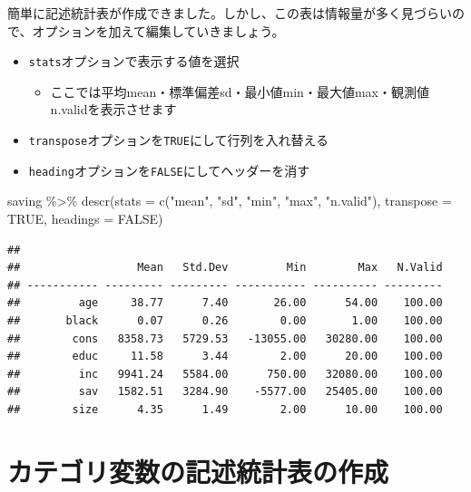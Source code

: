 \documentclass[
]{book}
\newenvironment{Shaded}{\begin{snugshade}}{\end{snugshade}}
\newcommand{\AttributeTok}[1]{\textcolor[rgb]{0.77,0.63,0.00}{#1}}
\newcommand{\ConstantTok}[1]{\textcolor[rgb]{0.00,0.00,0.00}{#1}}
\newcommand{\FunctionTok}[1]{\textcolor[rgb]{0.00,0.00,0.00}{#1}}
\newcommand{\NormalTok}[1]{#1}
\newcommand{\SpecialCharTok}[1]{\textcolor[rgb]{0.00,0.00,0.00}{#1}}
\newcommand{\StringTok}[1]{\textcolor[rgb]{0.31,0.60,0.02}{#1}}
\providecommand{\tightlist}{%
  \setlength{\itemsep}{0pt}\setlength{\parskip}{0pt}}
\begin{document}
簡単に記述統計表が作成できました。しかし、この表は情報量が多く見づらいので、オプションを加えて編集していきましょう。

\begin{itemize}
\tightlist
\item
  \texttt{stats}オプションで表示する値を選択

  \begin{itemize}
  \tightlist
  \item
    ここでは平均mean・標準偏差sd・最小値min・最大値max・観測値n.validを表示させます
  \end{itemize}
\item
  \texttt{transpose}オプションを\texttt{TRUE}にして行列を入れ替える
\item
  \texttt{heading}オプションを\texttt{FALSE}にしてヘッダーを消す
\end{itemize}

\begin{Shaded}
\begin{Highlighting}[]
\NormalTok{saving }\SpecialCharTok{\%\textgreater{}\%} 
  \FunctionTok{descr}\NormalTok{(}\AttributeTok{stats =} \FunctionTok{c}\NormalTok{(}\StringTok{"mean"}\NormalTok{, }\StringTok{"sd"}\NormalTok{, }\StringTok{"min"}\NormalTok{, }\StringTok{"max"}\NormalTok{, }\StringTok{"n.valid"}\NormalTok{), }\AttributeTok{transpose =} \ConstantTok{TRUE}\NormalTok{, }\AttributeTok{headings =} \ConstantTok{FALSE}\NormalTok{)}
\end{Highlighting}
\end{Shaded}

\begin{verbatim}
## 
##                  Mean   Std.Dev         Min        Max   N.Valid
## ----------- --------- --------- ----------- ---------- ---------
##         age     38.77      7.40       26.00      54.00    100.00
##       black      0.07      0.26        0.00       1.00    100.00
##        cons   8358.73   5729.53   -13055.00   30280.00    100.00
##        educ     11.58      3.44        2.00      20.00    100.00
##         inc   9941.24   5584.00      750.00   32080.00    100.00
##         sav   1582.51   3284.90    -5577.00   25405.00    100.00
##        size      4.35      1.49        2.00      10.00    100.00
\end{verbatim}

\hypertarget{ux30abux30c6ux30b4ux30eaux5909ux6570ux306eux8a18ux8ff0ux7d71ux8a08ux8868ux306eux4f5cux6210}{%
\section{カテゴリ変数の記述統計表の作成}\label{ux30abux30c6ux30b4ux30eaux5909ux6570ux306eux8a18ux8ff0ux7d71ux8a08ux8868ux306eux4f5cux6210}}
\end{document}
